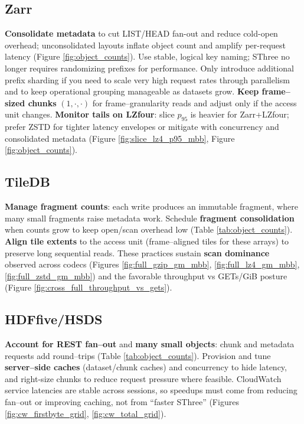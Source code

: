 \documentclass[nomenclature, english, bibtex]{kththesis}
\numberwithin{listing}{chapter}
\begin{document}
\subsection{Zarr}
\textbf{Consolidate metadata} to cut LIST/HEAD fan-out and reduce cold-open overhead; unconsolidated layouts inflate object count and amplify per-request latency (Figure \ref{fig:object_counts}). Use stable, logical key naming; \gls{SThree} no longer requires randomizing prefixes for performance. Only introduce additional prefix sharding if you need to scale very high request rates through parallelism and to keep operational grouping manageable as datasets grow. \textbf{Keep frame–sized chunks} \((1,\cdot,\cdot)\) for frame–granularity reads and adjust only if the access unit changes. \textbf{Monitor tails on \gls{LZfour}}: slice \(p_{95}\) is heavier for Zarr+\gls{LZfour}; prefer \gls{ZSTD} for tighter latency envelopes or mitigate with concurrency and consolidated metadata (Figure \ref{fig:slice_lz4_p95_mbb}, Figure \ref{fig:object_counts}).

\subsection{TileDB}
\textbf{Manage fragment counts}: each write produces an immutable fragment, where many small fragments raise metadata work. Schedule \textbf{fragment consolidation} when counts grow to keep open/scan overhead low (Table \ref{tab:object_counts}). \textbf{Align tile extents} to the access unit (frame–aligned tiles for these arrays) to preserve long sequential reads. These practices sustain \textbf{scan dominance} observed across codecs (Figures \ref{fig:full_gzip_gm_mbb}, \ref{fig:full_lz4_gm_mbb}, \ref{fig:full_zstd_gm_mbb}) and the favorable throughput vs GETs/GiB posture (Figure \ref{fig:cross_full_throughput_vs_gets}).

\subsection{\texorpdfstring{\gls{HDFfive}/\gls{HSDS}}{HDF5/HSDS}}
\textbf{Account for REST fan–out} and \textbf{many small objects}: chunk and metadata requests add round–trips (Table \ref{tab:object_counts}). Provision and tune \textbf{server–side caches} (dataset/chunk caches) and concurrency to hide latency, and right-size chunks to reduce request pressure where feasible. CloudWatch service latencies are stable across sessions, so speedups must come from reducing fan–out or improving caching, not from “faster \gls{SThree}” (Figures \ref{fig:cw_firstbyte_grid}, \ref{fig:cw_total_grid}).
\end{document}
